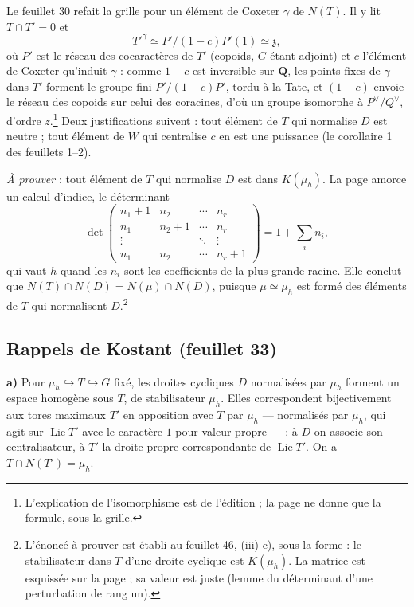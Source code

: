 \documentclass[11pt,a4paper]{article}
\begin{document}
Le feuillet 30 refait la grille pour un élément de Coxeter $\gamma$ de
$N(T)$. Il y lit $T\cap T'=0$ et
\[
  T'^{\gamma}\simeq P'/(1-c)P'(1)\simeq\mathfrak{z},
\]
où $P'$ est le réseau des cocaractères de $T'$ (copoids, $G$ étant adjoint) et
$c$ l'élément de Coxeter qu'induit $\gamma$ : comme $1-c$ est inversible sur
$\mathbf{Q}$, les points fixes de $\gamma$ dans $T'$ forment le groupe fini
$P'/(1-c)P'$, tordu à la Tate, et $(1-c)$ envoie le réseau des copoids sur celui
des coracines, d'où un groupe isomorphe à $P^{\vee}/Q^{\vee}$, d'ordre
$z$.\footnote{L'explication de l'isomorphisme est de l'édition ; la page ne
donne que la formule, sous la grille.} Deux justifications suivent : tout
élément de $T$ qui normalise $D$ est neutre ; tout élément de $W$ qui
centralise $c$ en est une puissance (le corollaire 1 des feuillets 1--2).

\emph{À prouver} : tout élément de $T$ qui normalise $D$ est dans
$K(\mu_{h})$. La page amorce un calcul d'indice, le déterminant
\[
  \det\begin{pmatrix}
    n_{1}+1 & n_{2} & \cdots & n_{r}\\
    n_{1} & n_{2}+1 & \cdots & n_{r}\\
    \vdots & & \ddots & \vdots\\
    n_{1} & n_{2} & \cdots & n_{r}+1
  \end{pmatrix}=1+\sum_{i}n_{i},
\]
qui vaut $h$ quand les $n_{i}$ sont les coefficients de la plus grande racine.
Elle conclut que $N(T)\cap N(D)=N(\mu)\cap N(D)$, puisque $\mu\simeq\mu_{h}$
est formé des éléments de $T$ qui normalisent $D$.\footnote{L'énoncé à
prouver est établi au feuillet 46, (iii) c), sous la forme : le stabilisateur
dans $T$ d'une droite cyclique est $K(\mu_{h})$. La matrice est esquissée sur la
page ; sa valeur est juste (lemme du déterminant d'une perturbation de rang
un).}

\subsection*{Rappels de Kostant (feuillet 33)}

\textbf{a)} Pour $\mu_{h}\hookrightarrow T\hookrightarrow G$ fixé, les droites
cycliques $D$ normalisées par $\mu_{h}$ forment un espace homogène sous $T$, de
stabilisateur $\mu_{h}$. Elles correspondent bijectivement aux tores maximaux
$T'$ en apposition avec $T$ par $\mu_{h}$ — normalisés par $\mu_{h}$, qui
agit sur $\operatorname{Lie}T'$ avec le caractère $1$ pour valeur propre — : à
$D$ on associe son centralisateur, à $T'$ la droite propre correspondante de
$\operatorname{Lie}T'$. On a $T\cap N(T')=\mu_{h}$.
\end{document}
